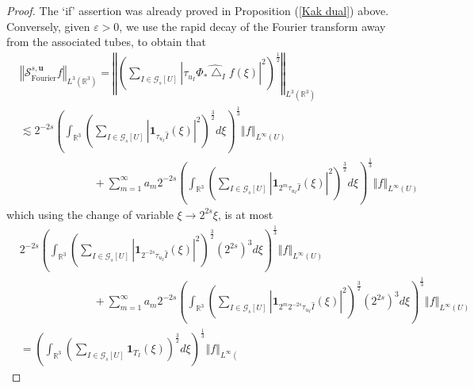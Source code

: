\documentclass{amsart}%
\theoremstyle{plain}
\numberwithin{equation}{section}
\begin{document}
\begin{proof}
The `if' assertion was already proved in Proposition (\ref{Kak dual}) above.
Conversely, given $\varepsilon>0$, we use the rapid decay of the Fourier
transform away from the associated tubes, to obtain that%
\begin{align}
&  \left\Vert \mathcal{S}_{\operatorname*{Fourier}}^{s,\mathbf{u}}f\right\Vert
_{L^{3}\left(  \mathbb{R}^{3}\right)  }=\left\Vert \left(  \sum_{I\in
\mathcal{G}_{s}\left[  U\right]  }\left\vert \tau_{u_{I}}\widehat{\Phi_{\ast
}\bigtriangleup_{I}f}\left(  \xi\right)  \right\vert ^{2}\right)  ^{\frac
{1}{2}}\right\Vert _{L^{3}\left(  \mathbb{R}^{3}\right)  }\label{rap}\\
&  \lesssim2^{-2s}\left(  \int_{\mathbb{R}^{3}}\left(  \sum_{I\in
\mathcal{G}_{s}\left[  U\right]  }\left\vert \mathbf{1}_{\tau_{u_{I}}%
\widehat{I}}\left(  \xi\right)  \right\vert ^{2}\right)  ^{\frac{3}{2}}%
d\xi\right)  ^{\frac{1}{3}}\left\Vert f\right\Vert _{L^{\infty}\left(
U\right)  }\nonumber\\
&  \ \ \ \ \ \ \ \ \ \ \ \ \ \ \ \ \ \ \ \ \ \ \ \ \ \ \ \ \ \ +\sum
_{m=1}^{\infty}a_{m}2^{-2s}\left(  \int_{\mathbb{R}^{3}}\left(  \sum
_{I\in\mathcal{G}_{s}\left[  U\right]  }\left\vert \mathbf{1}_{2^{m}%
\tau_{u_{I}}\widehat{I}}\left(  \xi\right)  \right\vert ^{2}\right)
^{\frac{3}{2}}d\xi\right)  ^{\frac{1}{3}}\left\Vert f\right\Vert _{L^{\infty
}\left(  U\right)  }\nonumber
\end{align}
which using the change of variable $\xi\rightarrow2^{2s}\xi$, is at most%
\begin{align*}
&  2^{-2s}\left(  \int_{\mathbb{R}^{3}}\left(  \sum_{I\in\mathcal{G}%
_{s}\left[  U\right]  }\left\vert \mathbf{1}_{2^{-2s}\tau_{u_{I}}\widehat{I}%
}\left(  \xi\right)  \right\vert ^{2}\right)  ^{\frac{3}{2}}\left(
2^{2s}\right)  ^{3}d\xi\right)  ^{\frac{1}{3}}\left\Vert f\right\Vert
_{L^{\infty}\left(  U\right)  }\\
&  \ \ \ \ \ \ \ \ \ \ \ \ \ \ \ \ \ \ \ \ \ \ \ \ \ \ \ \ \ \ +\sum
_{m=1}^{\infty}a_{m}2^{-2s}\left(  \int_{\mathbb{R}^{3}}\left(  \sum
_{I\in\mathcal{G}_{s}\left[  U\right]  }\left\vert \mathbf{1}_{2^{m}%
2^{-2s}\tau_{u_{I}}\widehat{I}}\left(  \xi\right)  \right\vert ^{2}\right)
^{\frac{3}{2}}\left(  2^{2s}\right)  ^{3}d\xi\right)  ^{\frac{1}{3}}\left\Vert
f\right\Vert _{L^{\infty}\left(  U\right)  }\\
&  =\left(  \int_{\mathbb{R}^{3}}\left(  \sum_{I\in\mathcal{G}_{s}\left[
U\right]  }\mathbf{1}_{T_{I}}\left(  \xi\right)  \right)  ^{\frac{3}{2}}%
d\xi\right)  ^{\frac{1}{3}}\left\Vert f\right\Vert _{L^{\infty}\left(
}
\end{align*}
\end{proof}
\end{document}
